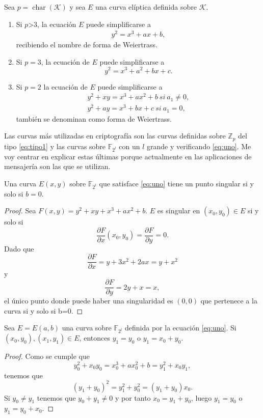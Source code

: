 \begin{proposicion}
		Sea $p=\operatorname{char}(\mathcal{K})$ y sea $E$ una curva elíptica definida sobre $\mathcal{K}$.
		\begin{enumerate}
			\item Si $p$\textgreater$3$, la ecuación $E$ puede simplificarse a
		\begin{align}
			y^2=x^3+ax+b,\label{eq:tipo1}
		\end{align}
		recibiendo el nombre de forma de Weiertrass.
			\item Si $p=3$, la ecuación de $E$ puede simplificarse a 
		\begin{equation}
			y^2=x^3+a^2+bx+c.
		\end{equation}
			\item Si $p=2$ la ecuación de $E$ puede simplificarse a 
				\begin{align}
					y^2+xy=x^3+ax^2+b \: si\: a_1 \neq 0,\label{eq:uno}\\
					y^2+ay=x^3+bx+c \: si\: a_1=0,\label{eq:dos}
				\end{align}
		también se denominan como forma de Weiertrass.
		\end{enumerate}
\end{proposicion}

Las curvas más utilizadas en criptografía son las curvas definidas sobre $\mathbb{Z}_p$ del tipo \eqref{eq:tipo1} y las curvas sobre $\mathbb{F}_{2^l}$ con un $l$ grande y verificando \eqref{eq:uno}. Me voy centrar en explicar estas últimas porque actualmente en las aplicaciones de mensajería son las que se utilizan.

\begin{proposicion}
	Una curva $E(x,y)$ sobre $\mathbb{F}_{2^l}$ que satisface \eqref{eq:uno} tiene un punto singular si y solo si $b=0$.
\end{proposicion}
\begin{proof}
	Sea $F(x,y)=y^2+xy+x^3+ax^2+b$. $E$ es singular en $(x_0,y_0)\in E$ si y solo si  
	$$
		\frac{\partial F}{\partial x}(x_0,y_0)=\frac{\partial F}{\partial y}=0.
	$$
	Dado que
	$$
		\frac{\partial F}{\partial x} = y+3x^2+2ax=y+x^2
	$$
	y
	$$
		\frac{\partial F}{\partial y}=2y+x=x,
	$$
	el único punto donde puede haber una singularidad es $(0,0)$ que pertenece a la curva si y solo si b=0.
\end{proof}

\begin{lema}
	Sea $E=E(a,b)$ una curva sobre $\mathbb{F}_{2^l}$ definida por la ecuación \eqref{eq:uno}. Si $(x_0,y_0), (x_1,y_1)\in E$, entonces $y_1=y_0$ o $y_1=x_0+y_0$.
\end{lema}
\begin{proof}
	Como se cumple que
	$$
		y_0^2+x_0y_0=x_0^3+ax_0^2+b=y_1^2+x_0y_1,
	$$
	tenemos que
	$$
		(y_1+y_0)^2=y_1^2+y_0^2=(y_1+y_0)x_0.
	$$
	Si $y_0\neq y_1$ tenemos que $y_0+y_1\neq0$ y por tanto $x_0=y_1+y_0$, luego $y_1=y_0$ o $y_1=y_0+x_0$.
\end{proof}

